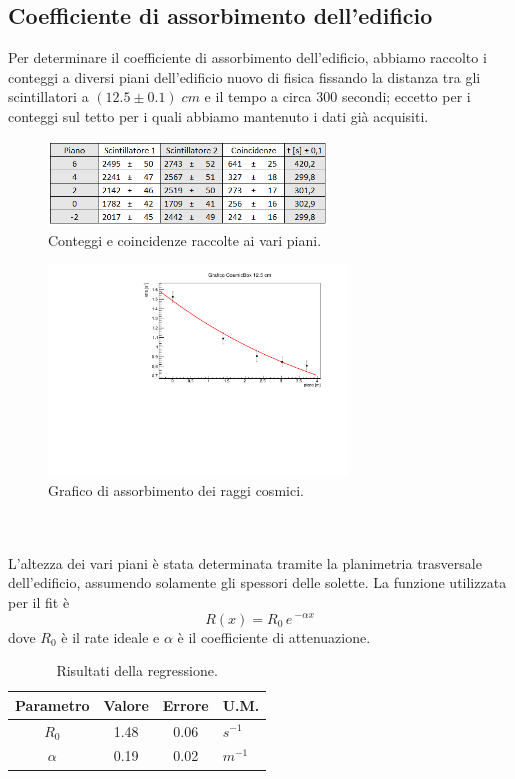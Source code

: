 \documentclass[11pt]{article} %
\begin{document}
\subsection{Coefficiente di assorbimento dell'edificio}
Per determinare il coefficiente di assorbimento dell'edificio, abbiamo raccolto i conteggi a diversi piani dell'edificio nuovo di fisica fissando la distanza tra gli scintillatori a $\left(12.5\pm0.1\right)\;cm$ e il tempo a circa 300 secondi; eccetto per i conteggi sul tetto per i quali abbiamo mantenuto i dati già acquisiti.
\begin{figure}[h!]
\begin{center}
\includegraphics[width=280px]{img/CB4.PNG}
\caption{Conteggi e coincidenze raccolte ai vari piani.}
\label{fig:CBa}
\end{center}
\end{figure}
\begin{figure}[h!]
\begin{center}
\includegraphics[width=300px]{img/CBexp.pdf}
\caption{Grafico di assorbimento dei raggi cosmici.}
\label{fig:CBexp}
\end{center}
\end{figure}
\\\\ L'altezza dei vari piani è stata determinata tramite la planimetria trasversale dell'edificio, assumendo solamente gli spessori delle solette. La funzione utilizzata per il fit è
\begin{equation}
R\left(x\right)=R_{0}\,e\,^{-\alpha x}
\end{equation}
dove $R_0$ è il rate ideale e $\alpha$ è il coefficiente di attenuazione.
\begin{table}[!h]
\begin{center}
\begin{tabular}{|c|c|c|l|}
\hline
\multicolumn{1}{|l|}{Parametro} & \multicolumn{1}{l|}{Valore} & \multicolumn{1}{l|}{Errore} & U.M. \\ \hline
$R_0$                               & 1.48                       & 0.06                       &    $s^{-1}$  \\ \hline
$\alpha$                               & 0.19                       & 0.02                          & $m^{-1}$   \\ \hline
\end{tabular}
\end{center}
\caption{Risultati della regressione.}
\end{table}
\end{document}
